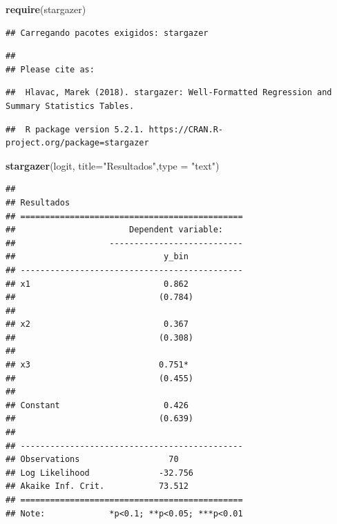 \documentclass[12pt,brazil,]{book}
\newenvironment{Shaded}{\begin{snugshade}}{\end{snugshade}}
\newcommand{\DataTypeTok}[1]{\textcolor[rgb]{0.13,0.29,0.53}{#1}}
\newcommand{\KeywordTok}[1]{\textcolor[rgb]{0.13,0.29,0.53}{\textbf{#1}}}
\newcommand{\NormalTok}[1]{#1}
\newcommand{\StringTok}[1]{\textcolor[rgb]{0.31,0.60,0.02}{#1}}
\begin{document}
\begin{Shaded}
\begin{Highlighting}[]
\KeywordTok{require}\NormalTok{(stargazer)}
\end{Highlighting}
\end{Shaded}

\begin{verbatim}
## Carregando pacotes exigidos: stargazer
\end{verbatim}

\begin{verbatim}
## 
## Please cite as:
\end{verbatim}

\begin{verbatim}
##  Hlavac, Marek (2018). stargazer: Well-Formatted Regression and Summary Statistics Tables.
\end{verbatim}

\begin{verbatim}
##  R package version 5.2.1. https://CRAN.R-project.org/package=stargazer
\end{verbatim}

\begin{Shaded}
\begin{Highlighting}[]
\KeywordTok{stargazer}\NormalTok{(logit, }\DataTypeTok{title=}\StringTok{"Resultados"}\NormalTok{,}\DataTypeTok{type =} \StringTok{"text"}\NormalTok{)}
\end{Highlighting}
\end{Shaded}

\begin{verbatim}
## 
## Resultados
## =============================================
##                       Dependent variable:    
##                   ---------------------------
##                              y_bin           
## ---------------------------------------------
## x1                           0.862           
##                             (0.784)          
##                                              
## x2                           0.367           
##                             (0.308)          
##                                              
## x3                          0.751*           
##                             (0.455)          
##                                              
## Constant                     0.426           
##                             (0.639)          
##                                              
## ---------------------------------------------
## Observations                  70             
## Log Likelihood              -32.756          
## Akaike Inf. Crit.           73.512           
## =============================================
## Note:             *p<0.1; **p<0.05; ***p<0.01
\end{verbatim}
\end{document}
